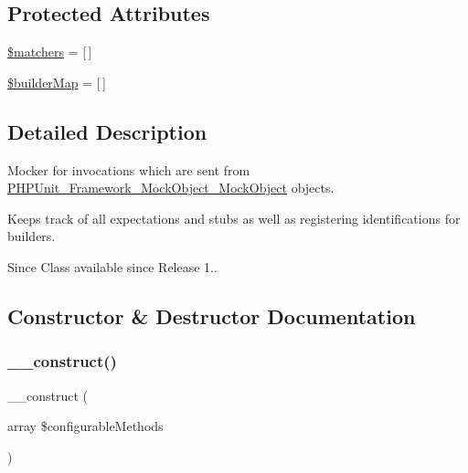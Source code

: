 \subsection*{Protected Attributes}
\begin{DoxyCompactItemize}
\item 
\mbox{\hyperlink{class_p_h_p_unit___framework___mock_object___invocation_mocker_a15c8eaa1637f78d33e7f2d47e86cb76e}{\$matchers}} = \mbox{[}$\,$\mbox{]}
\item 
\mbox{\hyperlink{class_p_h_p_unit___framework___mock_object___invocation_mocker_a5ee6d0763adc965298ff920482b98c69}{\$builder\+Map}} = \mbox{[}$\,$\mbox{]}
\end{DoxyCompactItemize}


\subsection{Detailed Description}
Mocker for invocations which are sent from \mbox{\hyperlink{interface_p_h_p_unit___framework___mock_object___mock_object}{P\+H\+P\+Unit\+\_\+\+Framework\+\_\+\+Mock\+Object\+\_\+\+Mock\+Object}} objects.

Keeps track of all expectations and stubs as well as registering identifications for builders.

\begin{DoxySince}{Since}
Class available since Release 1.. 
\end{DoxySince}


\subsection{Constructor \& Destructor Documentation}
\mbox{\label{class_p_h_p_unit___framework___mock_object___invocation_mocker_ab20d70583bce1dc095fd863640fcad9d}} 
\subsubsection{\texorpdfstring{\+\_\+\+\_\+construct()}{\_\_construct()}}
{\footnotesize\ttfamily \+\_\+\+\_\+construct (\begin{DoxyParamCaption}\item[{array}]{\$configurable\+Methods }\end{DoxyParamCaption})}



